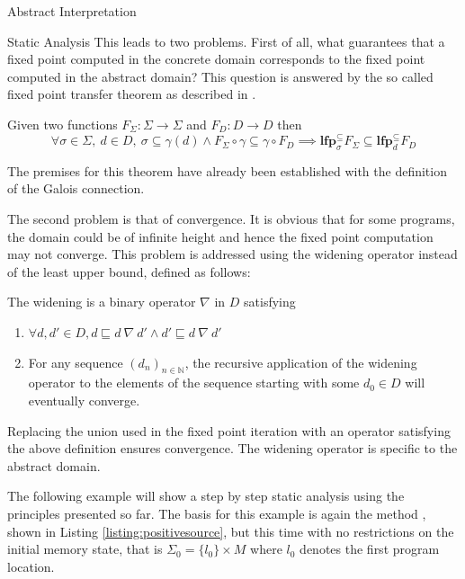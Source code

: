 \begin{chapter}{Abstract Interpretation}
\begin{section}{Static Analysis}
		This leads to two problems. First of all, what guarantees that a fixed point computed in the concrete domain corresponds to the fixed point computed in the abstract domain? This question is answered by the so called fixed point transfer theorem as described in \cite{mauborgne:rival05}.

		\begin{theorem}
			\label{theorem:FixedPointTransfer}
			Given two functions $F_\Sigma: \Sigma \to \Sigma$ and $F_D: D \to D$ then
			\begin{equation}
				\forall \sigma \in \Sigma, \ d \in D, \ \sigma \subseteq \gamma(d) \land F_\Sigma \circ \gamma \subseteq \gamma \circ F_D \implies \textbf{lfp}_\sigma^\subseteq F_\Sigma \subseteq \textbf{lfp}_d^\subseteq F_D
			\end{equation}
		\end{theorem}

		The premises for this theorem have already been established with the definition of the Galois connection.

		The second problem is that of convergence. It is obvious that for some programs, the domain could be of infinite height and hence the fixed point computation may not converge. This problem is addressed using the widening operator instead of the least upper bound, defined as follows:

		\begin{definition}[Widening]
			\label{definition:widening}
			The widening is a binary operator $\nabla$ in $D$ satisfying
			\begin{enumerate}
				\item $\forall d, d' \in D, d \sqsubseteq d \ \nabla \ d' \land d' \sqsubseteq d \ \nabla \ d'$
				\item For any sequence $(d_n)_{n \in \mathbb{N}}$, the recursive application of the widening operator to the elements of the sequence starting with some $d_0 \in D$ will eventually converge.
			\end{enumerate}
		\end{definition}

		Replacing the union used in the fixed point iteration with an operator satisfying the above definition ensures convergence. The widening operator is specific to the abstract domain.

		\begin{example}
			The following example will show a step by step static analysis using the principles presented so far. The basis for this example is again the method , shown in Listing \ref{listing:positivesource}, but this time with no restrictions on the initial memory state, that is $\Sigma_0 = \{l_0\} \times M$ where $l_0$ denotes the first program location. 
			

\end{example}
\end{section}
\end{chapter}
